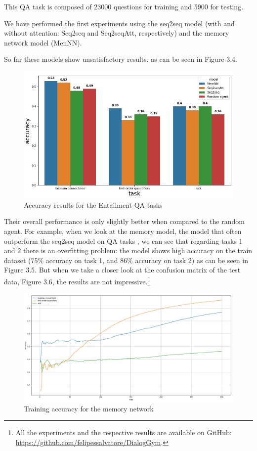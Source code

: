 This QA task is composed of 23000 questions for training and 5900 for testing.

We have performed the first experiments using the seq2seq model (with and without attention: Seq2seq and Seq2seqAtt, respectively) and the memory network model (MenNN).

So far these models show unsatisfactory results, as can be seen in Figure 3.4.

\begin{center}
\begin{figure}[h]
\label{EntailQAresults}
\includegraphics[width=13.0cm]{img/comparative_results.png}
\caption{Accuracy results for the Entailment-QA tasks}
\end{figure}
\end{center}

Their overall performance is only slightly better when compared to the random agent. For example, when we look at the memory model, the model that often  outperform the seq2seq model on QA tasks \cite{WestonBCM15}, we can see that regarding tasks 1 and 2 there is an overfitting problem: the model shows high accuracy on the train dataset (75$\%$ accuracy on task 1, and 86$\%$ accuracy on task 2) as can be seen in Figure 3.5. But when we take a closer look at the confusion matrix of the test data, Figure 3.6, the results are not impressive.\footnote{All the experiments and the respective results are available on GitHub: \url{https://github.com/felipessalvatore/DialogGym}.}
  

\begin{center}
\begin{figure}[h]
\includegraphics[width=13.0cm]{img/training_acc_EntailQA_mem.png}
\caption{Training accuracy for the memory network}
\end{figure}
\end{center}


